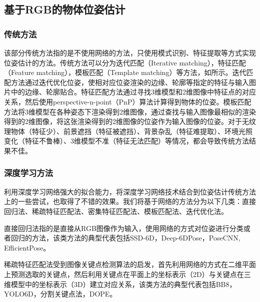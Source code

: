 \subsection{基于RGB的物体位姿估计}
\subsubsection{传统方法}
\par 该部分传统方法指的是不使用网络的方法，只使用模式识别、特征提取等方式实现位姿估计的方法。传统方法可以分为迭代匹配（Iterative matching）\cite{lowe1987three}，特征匹配（Feature matching）\cite{rublee2011orb}，模板匹配（Template matching）\cite{hinterstoisser2013model}等方法，如所示。迭代匹配方法通过迭代优化位姿，使相对应位姿渲染的边缘、轮廓等指定的特征与输入图片中的边缘、轮廓贴合。特征匹配方法通过寻找3维模型和2维图像中特征点的对应关系，然后使用perspective-n-point（PnP）算法\cite{lepetit2009ep}计算得到物体的位姿。模板匹配方法将3维模型在各种姿态下渲染得到2维图像，通过查找与输入图像最相似的渲染得到的2维图像，将这张渲染得到的2维图像的位姿作为输入图像的位姿。对于无纹理物体（特征少）、前景遮挡（特征被遮挡）、背景杂乱（特征难提取）、环境光照变化（特征不鲁棒）、3维模型不准（特征无法匹配）等情况，都会导致传统方法结果不佳。
\subsubsection{深度学习方法}
\par 利用深度学习网络强大的拟合能力，将深度学习网络技术结合到位姿估计传统方法上的一些尝试，也取得了不错的效果。我们将基于网络的方法分为以下几类：直接回归法、稀疏特征匹配法、密集特征匹配法、模板匹配法、迭代优化法。
\par 直接回归法指的是直接从RGB图像作为输入，使用网络的方式对位姿进行分类或者回归的方法，该类方法的典型代表包括SSD-6D\cite{kehl2017ssd}，Deep-6DPose\cite{do2018deep}，PoseCNN\cite{xiang2018posecnn}, EfficientPose\cite{bukschat2020efficientpose}。
\par 稀疏特征匹配法受到图像关键点检测算法的启发，首先利用网络的方式在二维平面上预测选取的关键点，然后利用关键点在平面上的坐标表示（2D）与关键点在三维模型中的坐标表示（3D）建立对应关系，该类方法的典型代表包括BB8\cite{rad2017bb8}，YOLO6D\cite{tekin2018real}，分割关键点法\cite{hu2019segmentation}，DOPE。

